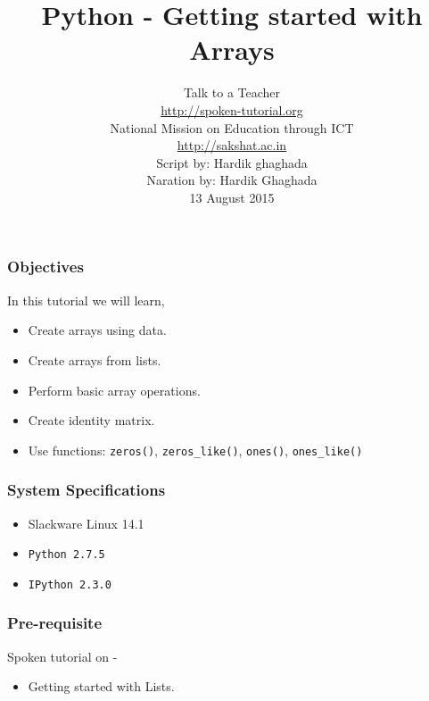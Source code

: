 \documentclass[17pt,compress]{beamer}
\author[FOSSEE]{}
\institute[IIT Bombay]{}
\date[]{}
\begin{document}
\sffamily \bfseries
\title
[Getting started with Arrays]
{Python - Getting started with Arrays}
\author
[FOSSEE, IIT - Bombay]
{\small Talk to a Teacher\\{\color{blue}\url{http://spoken-tutorial.org}}\\National Mission on Education
 through ICT\\{\color{blue}\url{http://sakshat.ac.in}} \\[0.5cm]{\tiny Script by: Hardik ghaghada \\ Naration by: Hardik Ghaghada \\ 13 August 2015}}

\begin{frame}
   \titlepage
\end{frame}
\begin{frame}
\frametitle{Objectives}
\label{sec-2}

  In this tutorial we will learn, \pause


\begin{itemize}
\item Create arrays using data.\pause
\item Create arrays from lists.\pause
\item Perform basic array operations.\pause
\item Create identity matrix.\pause
\item Use functions: \texttt{zeros()}, \texttt{zeros\_like()}, \texttt{ones()}, \texttt{ones\_like()}
\end{itemize}
\end{frame}
\begin{frame}
\frametitle{System Specifications}\pause
\begin{itemize}
\item Slackware Linux 14.1\pause
\item \texttt{Python 2.7.5} \pause
\item \texttt{IPython 2.3.0}
\end{itemize}
\end{frame}
\begin{frame}
\frametitle{Pre-requisite}
\label{sec-3}

  Spoken tutorial on -

\begin{itemize}
\item Getting started with Lists.
\end{itemize}
\end{frame}
\end{document}
